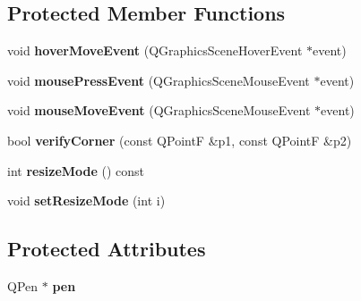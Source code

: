 \subsection*{Protected Member Functions}
\begin{DoxyCompactItemize}
\item 
\hypertarget{class_my_central_graphics_item_a37c26b04ff0579568550e479aca6b4c7}{}void {\bfseries hover\+Move\+Event} (Q\+Graphics\+Scene\+Hover\+Event $\ast$event)\label{class_my_central_graphics_item_a37c26b04ff0579568550e479aca6b4c7}

\item 
\hypertarget{class_my_central_graphics_item_ac2eca49285c8f2058c8faab20ec46b48}{}void {\bfseries mouse\+Press\+Event} (Q\+Graphics\+Scene\+Mouse\+Event $\ast$event)\label{class_my_central_graphics_item_ac2eca49285c8f2058c8faab20ec46b48}

\item 
\hypertarget{class_my_central_graphics_item_a6b3c312c410910a45e0883e728312f3c}{}void {\bfseries mouse\+Move\+Event} (Q\+Graphics\+Scene\+Mouse\+Event $\ast$event)\label{class_my_central_graphics_item_a6b3c312c410910a45e0883e728312f3c}

\item 
\hypertarget{class_my_central_graphics_item_aa0d27bc8f661136a54a61e12d79e2386}{}bool {\bfseries verify\+Corner} (const Q\+Point\+F \&p1, const Q\+Point\+F \&p2)\label{class_my_central_graphics_item_aa0d27bc8f661136a54a61e12d79e2386}

\item 
\hypertarget{class_my_central_graphics_item_a7616ccc14383191dd0c69a0a3b3e4e2c}{}int {\bfseries resize\+Mode} () const \label{class_my_central_graphics_item_a7616ccc14383191dd0c69a0a3b3e4e2c}

\item 
\hypertarget{class_my_central_graphics_item_a37551f69c8e31e601036ceef0cc16a40}{}void {\bfseries set\+Resize\+Mode} (int i)\label{class_my_central_graphics_item_a37551f69c8e31e601036ceef0cc16a40}

\end{DoxyCompactItemize}
\subsection*{Protected Attributes}
\begin{DoxyCompactItemize}
\item 
\hypertarget{class_my_central_graphics_item_a64d9cd163863d34aa141ce8103dd8ec0}{}Q\+Pen $\ast$ {\bfseries pen}\label{class_my_central_graphics_item_a64d9cd163863d34aa141ce8103dd8ec0}

\end{DoxyCompactItemize}
